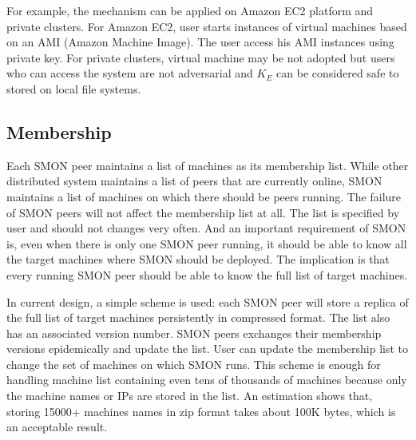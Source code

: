 For example, the mechanism can be applied on Amazon EC2
platform and private clusters. For Amazon EC2, user starts
instances of virtual machines based on an AMI (Amazon
Machine Image). The user access his AMI instances using
private key. For private clusters, virtual machine may be not
adopted but users who can access the system are not
adversarial and $K_E$ can be considered safe to stored on
local file systems.

\subsection{Membership}

Each SMON peer maintains a list of machines as its
membership list.  While other distributed system maintains a
list of peers that are currently online, SMON maintains a
list of machines on which there should be peers running. The
failure of SMON peers will not affect the membership list at
all.  The list is specified by user and should not changes
very often. And an important requirement of SMON is, even
when there is only one SMON peer running, it should be able
to know all the target machines where SMON should be
deployed.  The implication is that every running SMON peer
should be able to know the full list of target machines.

In current design, a simple scheme is used: each SMON peer
will store a replica of the full list of target machines
persistently in compressed format. The list also has an
associated version number. SMON peers exchanges their
membership versions epidemically and update the list. User
can update the membership list to change the set of machines
on which SMON runs.
This scheme is enough for handling machine list containing
even tens of thousands of machines because only the machine
names or IPs are stored in the list.  An estimation shows
that, storing 15000+ machines names in zip format takes
about 100K bytes, which is an acceptable result.


